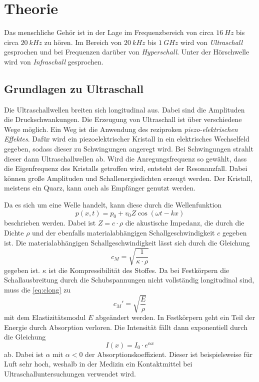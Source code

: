 \section{Theorie}
\label{sec:Theorie}

Das menschliche Gehör ist in der Lage im Frequenzbereich von circa $\qty{16}{Hz}$ bis circa $\qty{20}{kHz}$ zu hören.
Im Bereich von $\qty{20}{kHz}$ bis $\qty{1}{GHz}$ wird von \textit{Ultraschall} gesprochen und bei Frequenzen darüber von \textit{Hyperschall}.
Unter der Hörschwelle wird von \textit{Infraschall} gesprochen.


\subsection{Grundlagen zu Ultraschall}

Die Ultraschallwellen breiten sich longitudinal aus.
Dabei sind die Amplituden die Druckschwankungen. 
Die Erzeugung von Ultraschall ist über verschiedene Wege möglich.
Ein Weg ist die Anwendung des reziproken \textit{piezo-elektrischen Effektes}.
Dafür wird ein piezoelektrischer Kristall in ein elektrisches Wechselfeld gegeben, sodass dieser zu Schwingungen angeregt wird.
Bei Schwingungen strahlt dieser dann Ultraschallwellen ab.
Wird die Anregungsfrequenz so gewählt, dass die Eigenfrequenz des Kristalls getroffen wird, entsteht der Resonanzfall.
Dabei können große Amplituden und Schallenergiedichten erzeugt werden.
Der Kristall, meistens ein Quarz, kann auch als Empfänger genutzt werden.

Da es sich um eine Welle handelt, kann diese durch die Wellenfunktion
\begin{equation}
    p(x, t) = p_0 + v_0 Z \cos (\omega t - k x)
\end{equation}
beschrieben werden. Dabei ist $Z = c \cdot \rho$ die akustische Impedanz, die durch die Dichte $\rho$
und der ebenfalls materialabhängigen Schallgeschwindigkeit $c$ gegeben ist.
Die materialabhängigen Schallgeschwindigkeit lässt sich durch die Gleichung
\begin{equation} \label{eq:clong}
    c_M = \sqrt{\frac{1}{\kappa \cdot \rho}}
\end{equation}
gegeben ist. $\kappa$ ist die Kompressibilität des Stoffes.
Da bei Festkörpern die Schallausbreitung durch die Schubspannungen nicht vollständig longitudinal sind, muss die \autoref{eq:clong} zu
\begin{equation}
    c_M ' = \sqrt{\frac{E}{\rho}}
\end{equation}
mit dem Elastizitätsmodul $E$ abgeändert werden.
In Festkörpern geht ein Teil der Energie durch Absorption verloren.
Die Intensität fällt dann exponentiell durch die Gleichung
\begin{equation}
    I(x) = I_0 \cdot e^{\alpha x}
\end{equation}
ab. Dabei ist $\alpha$ mit $\alpha < 0$ der Absorptionskoeffizient.
Dieser ist beispielsweise für Luft sehr hoch, weshalb in der Medizin ein Kontaktmittel bei Ultraschalluntersuchungen verwendet wird. \\

